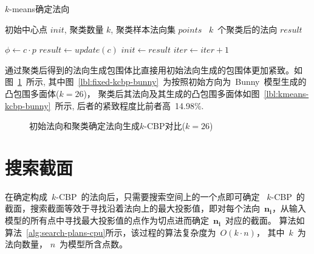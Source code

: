 \begin{algorithm}
\small
\caption{$k$-means确定法向}
\label{alg:kmeans-determine-normals}
\begin{algorithmic}[1]
\REQUIRE
初始中心点 $init$, 聚类数量 $k$, 聚类样本法向集 $points$
\ENSURE
~$k$~个聚类后的法向 $result$

        \STATE $\phi \gets c \cdot p$ 
    \ENDFOR
        \STATE $result \gets update(c)$ 
    \ELSE
        \STATE $init \gets result $
        \STATE $iter \gets iter+1 $
    \ENDIF
    \ENDFOR
\ENDFOR
\end{algorithmic}
\end{algorithm}


通过聚类后得到的法向生成包围体比直接用初始法向生成的包围体更加紧致。如图~\ref{lbl:kemans-fixed-kcbp}~所示, 
其中图~\ref{lbl:fixed-kcbp-bunny}~为按照初始方向为~Bunny~模型生成的凸包围多面体($k=26$)，
聚类后其法向及其生成的凸包围多面体如图~\ref{lbl:kmeans-kcbp-bunny}~所示, 后者的紧致程度比前者高~14.98\%.

\begin{figure}[htbp]
\setcounter{subfigure}{0}
  \centering
  \hspace{3em}%
  \hspace{3em}%
  \caption{初始法向和聚类确定法向生成$k$-CBP对比($k=26$)}
  \label{lbl:kemans-fixed-kcbp}
\end{figure}

\section{搜索截面}
\label{sec:search:planes}

在确定构成~$k$-CBP~的法向后，只需要搜索空间上的一个点即可确定
~$k$-CBP~的截面，搜索截面等效于寻找沿着法向上的最大投影值，即对每个法向~$\bm{n_i}$，从输入模型的所有点中寻找最大投影值的点作为切点进而确定~$\bm{n_i}$~对应的截面。
算法如算法~\ref{alg:search-plans-cpu}所示，该过程的算法复杂度为~$O(k\cdot
n)$， 其中~$k$~为法向数量， $n$~为模型所含点数。


